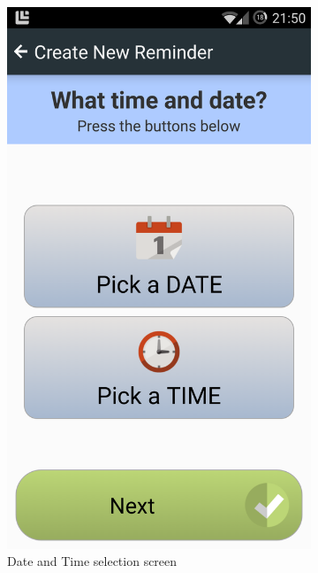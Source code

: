\begin{figure}[h]
    \centering
    \begin{subfigure}[t]{0.3\textwidth}
        \centering
        \includegraphics[width=\textwidth]{Files/treatment-study-1/figures/app-remindercreate-1}
        \caption{Date and Time selection screen}
        \label{fig: remindercreate-time}
    \end{subfigure}
    \hfill
    \begin{subfigure}[t]{0.3\textwidth}

\end{subfigure}
\end{figure}
